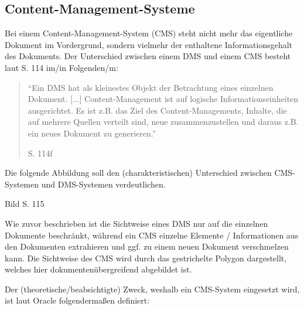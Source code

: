 \subsection{Content-Management-Systeme}
Bei einem Content-Management-System (\gls{CMS})  steht nicht mehr das eigentliche Dokument im Vordergrund, sondern vielmehr der enthaltene Informationsgehalt des Dokuments.
Der Unterschied zwischen einem \gls{DMS} und einem \gls{CMS} besteht laut \cite{DMS08} S. 114 im/in Folgenden/m:


\begin{quote}"`Ein \gls{DMS} hat als kleinestes Objekt der Betrachtung eines einzelnen Dokument. [...] Content-Management ist auf logische Informationseinheiten ausgerichtet. Es ist z.B. das Ziel des Content-Managements, Inhalte, die auf mehrere Quellen verteilt sind, neue zusammenzustellen und daraus z.B. ein neues Dokument zu generieren."'
\begin{flushright}\cite{DMS08} S. 114f\end{flushright}\end{quote}

Die folgende Abbildung soll den (charakteristischen) Unterschied zwischen \gls{CMS}-Systemen und \gls{DMS}-Systemen verdeutlichen.

\begin{center}
Bild \cite{DMS08} S. 115
\end{center}

Wie zuvor beschrieben ist die Sichtweise eines \gls{DMS} nur auf die einzelnen Dokumente beschränkt, während ein \gls{CMS} einzelne Elemente / Informationen aus den Dokumenten extrahieren und ggf. zu einem neuen Dokument verschmelzen kann. Die Sichtweise des \gls{CMS} wird durch das gestrichelte Polygon dargestellt, welches hier dokumentenübergreifend abgebildet ist.

Der (theoretische/beabsichtigte) Zweck, weshalb ein \gls{CMS}-System eingesetzt wird, ist laut Oracle folgendermaßen definiert:

